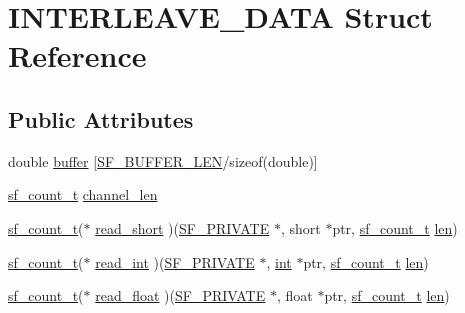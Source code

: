 \hypertarget{struct_i_n_t_e_r_l_e_a_v_e___d_a_t_a}{}\section{I\+N\+T\+E\+R\+L\+E\+A\+V\+E\+\_\+\+D\+A\+TA Struct Reference}
\label{struct_i_n_t_e_r_l_e_a_v_e___d_a_t_a}
\subsection*{Public Attributes}
\begin{DoxyCompactItemize}
\item 
double \hyperlink{struct_i_n_t_e_r_l_e_a_v_e___d_a_t_a_aa1313eca4d1a109db9324ff43a492239}{buffer} \mbox{[}\hyperlink{libsndfile_2src_2common_8h_a9ad225cf481d61f73f54fd0ca9b9af08}{S\+F\+\_\+\+B\+U\+F\+F\+E\+R\+\_\+\+L\+EN}/sizeof(double)\mbox{]}
\item 
\hyperlink{mac_2config_2i386_2lib-src_2libsndfile_2src_2sndfile_8h_a398121a5f562230ea7f772528fff5f84}{sf\+\_\+count\+\_\+t} \hyperlink{struct_i_n_t_e_r_l_e_a_v_e___d_a_t_a_adc56c5b5d8352de02860a8a406171500}{channel\+\_\+len}
\item 
\hyperlink{mac_2config_2i386_2lib-src_2libsndfile_2src_2sndfile_8h_a398121a5f562230ea7f772528fff5f84}{sf\+\_\+count\+\_\+t}($\ast$ \hyperlink{struct_i_n_t_e_r_l_e_a_v_e___d_a_t_a_ac494fcdef30c3abff24341ef4abaea9f}{read\+\_\+short} )(\hyperlink{libsndfile_2src_2common_8h_ab5debd339ecaf40f50a223e218900c24}{S\+F\+\_\+\+P\+R\+I\+V\+A\+TE} $\ast$, short $\ast$ptr, \hyperlink{mac_2config_2i386_2lib-src_2libsndfile_2src_2sndfile_8h_a398121a5f562230ea7f772528fff5f84}{sf\+\_\+count\+\_\+t} \hyperlink{lib_2expat_8h_af86d325fecfc8f47b61fbf5a5146f582}{len})
\item 
\hyperlink{mac_2config_2i386_2lib-src_2libsndfile_2src_2sndfile_8h_a398121a5f562230ea7f772528fff5f84}{sf\+\_\+count\+\_\+t}($\ast$ \hyperlink{struct_i_n_t_e_r_l_e_a_v_e___d_a_t_a_a6862fab891760b0f0a01e8c4aaea3ad6}{read\+\_\+int} )(\hyperlink{libsndfile_2src_2common_8h_ab5debd339ecaf40f50a223e218900c24}{S\+F\+\_\+\+P\+R\+I\+V\+A\+TE} $\ast$, \hyperlink{xmltok_8h_a5a0d4a5641ce434f1d23533f2b2e6653}{int} $\ast$ptr, \hyperlink{mac_2config_2i386_2lib-src_2libsndfile_2src_2sndfile_8h_a398121a5f562230ea7f772528fff5f84}{sf\+\_\+count\+\_\+t} \hyperlink{lib_2expat_8h_af86d325fecfc8f47b61fbf5a5146f582}{len})
\item 
\hyperlink{mac_2config_2i386_2lib-src_2libsndfile_2src_2sndfile_8h_a398121a5f562230ea7f772528fff5f84}{sf\+\_\+count\+\_\+t}($\ast$ \hyperlink{struct_i_n_t_e_r_l_e_a_v_e___d_a_t_a_a7e7851184ca08d55664d25474dd467c6}{read\+\_\+float} )(\hyperlink{libsndfile_2src_2common_8h_ab5debd339ecaf40f50a223e218900c24}{S\+F\+\_\+\+P\+R\+I\+V\+A\+TE} $\ast$, float $\ast$ptr, \hyperlink{mac_2config_2i386_2lib-src_2libsndfile_2src_2sndfile_8h_a398121a5f562230ea7f772528fff5f84}{sf\+\_\+count\+\_\+t} \hyperlink{lib_2expat_8h_af86d325fecfc8f47b61fbf5a5146f582}{len})

\end{DoxyCompactItemize}
